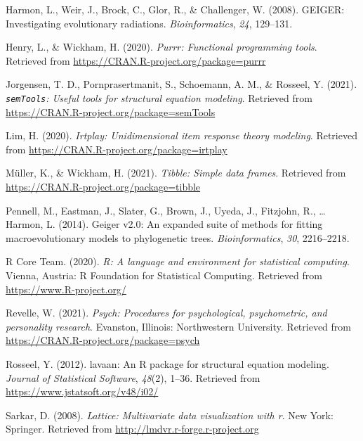 \documentclass[
  english,
  man]{apa6}
\newlength{\cslhangindent}
\newlength{\cslentryspacingunit} %
\newenvironment{CSLReferences}[2] %
 {%
  \setlength{\parindent}{0pt}
  \ifodd #1
  \let\oldpar\par
  \def\par{\hangindent=\cslhangindent\oldpar}
  \fi
  \setlength{\parskip}{#2\cslentryspacingunit}
 }%
 {}
\begin{document}
\begin{CSLReferences}{1}{0}
\leavevmode{}%
Harmon, L., Weir, J., Brock, C., Glor, R., \& Challenger, W. (2008). GEIGER: Investigating evolutionary radiations. \emph{Bioinformatics}, \emph{24}, 129--131.

\leavevmode{}%
Henry, L., \& Wickham, H. (2020). \emph{Purrr: Functional programming tools}. Retrieved from \url{https://CRAN.R-project.org/package=purrr}

\leavevmode{}%
Jorgensen, T. D., Pornprasertmanit, S., Schoemann, A. M., \& Rosseel, Y. (2021). \emph{\texttt{semTools}: {U}seful tools for structural equation modeling}. Retrieved from \url{https://CRAN.R-project.org/package=semTools}

\leavevmode{}%
Lim, H. (2020). \emph{Irtplay: Unidimensional item response theory modeling}. Retrieved from \url{https://CRAN.R-project.org/package=irtplay}

\leavevmode{}%
Müller, K., \& Wickham, H. (2021). \emph{Tibble: Simple data frames}. Retrieved from \url{https://CRAN.R-project.org/package=tibble}

\leavevmode{}%
Pennell, M., Eastman, J., Slater, G., Brown, J., Uyeda, J., Fitzjohn, R., \ldots{} Harmon, L. (2014). Geiger v2.0: An expanded suite of methods for fitting macroevolutionary models to phylogenetic trees. \emph{Bioinformatics}, \emph{30}, 2216--2218.

\leavevmode{}%
R Core Team. (2020). \emph{R: A language and environment for statistical computing}. Vienna, Austria: R Foundation for Statistical Computing. Retrieved from \url{https://www.R-project.org/}

\leavevmode{}%
Revelle, W. (2021). \emph{Psych: Procedures for psychological, psychometric, and personality research}. Evanston, Illinois: Northwestern University. Retrieved from \url{https://CRAN.R-project.org/package=psych}

\leavevmode{}%
Rosseel, Y. (2012). {lavaan}: An {R} package for structural equation modeling. \emph{Journal of Statistical Software}, \emph{48}(2), 1--36. Retrieved from \url{https://www.jstatsoft.org/v48/i02/}

\leavevmode{}%
Sarkar, D. (2008). \emph{Lattice: Multivariate data visualization with r}. New York: Springer. Retrieved from \url{http://lmdvr.r-forge.r-project.org}


\end{CSLReferences}
\end{document}
